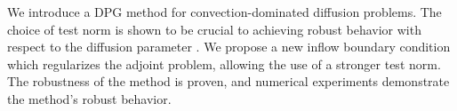We introduce a DPG method for convection-dominated diffusion problems.  The choice of test norm is shown to be crucial to achieving robust behavior with respect to the diffusion parameter \cite{DPGrobustness}.  We propose a new inflow boundary condition which regularizes the adjoint problem, allowing the use of a stronger test norm.  The robustness of the method is proven, and numerical experiments demonstrate the method's robust behavior.  
